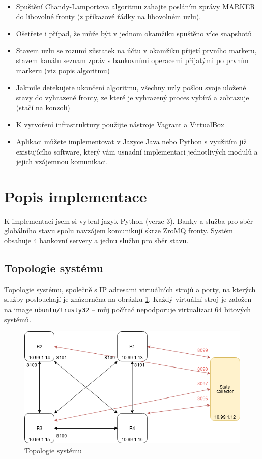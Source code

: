 \documentclass[11pt,a4paper]{scrartcl}
\begin{document}
\begin{itemize}
		\item Spuštění Chandy-Lamportova algoritmu zahajte posláním zprávy MARKER do libovolné fronty (z příkazové
		řádky na libovolném uzlu).

		\item Ošetřete i případ, že může být v jednom okamžiku spuštěno více snapshotů

		\item Stavem uzlu se rozumí zůstatek na účtu v okamžiku přijetí prvního markeru, stavem kanálu seznam zpráv s
		bankovními operacemi přijatými po prvním markeru (viz popis algoritmu)

		\item Jakmile detekujete ukončení algoritmu, všechny uzly pošlou svoje uložené stavy do vyhrazené fronty, ze které
		je vyhrazený proces vybírá a zobrazuje (stačí na konzoli)

		\item K vytvoření infrastruktury použijte nástroje Vagrant a VirtualBox

		\item Aplikaci můžete implementovat v Jazyce Java nebo Python s využitím již existujícího software, který vám
		usnadní implementaci jednotlivých modulů a jejich vzájemnou komunikaci.
	\end{itemize}
	
	
	
	\section{Popis implementace}
	K implementaci jsem si vybral jazyk Python (verze 3). Banky a služba pro sběr globálního stavu spolu navzájem komunikují skrze ZroMQ fronty. Systém obsahuje 4 bankovní servery a jednu službu pro sběr stavu.
	
	\subsection{Topologie systému}
	Topologie systému, společně s IP adresami virtuálních strojů a porty, na kterých služby poslouchají je znázorněna na obrázku \ref{fig:topology}. Každý virtuální stroj je založen na image \verb|ubuntu/trusty32| -- můj počítač nepodporuje virtualizaci 64 bitových systémů. 
	
	\begin{figure}[H]
		\centering
		\includegraphics[width=15cm]{img/topologie.png}
		\caption{Topologie systému}
		\label{fig:topology}
	\end{figure}
\end{document}
